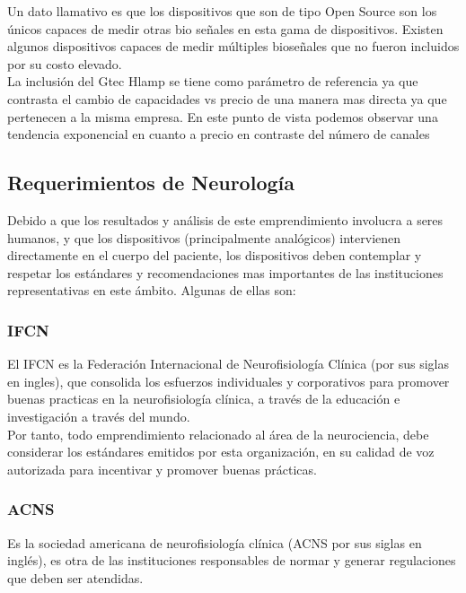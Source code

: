 Un dato llamativo es que los dispositivos que son de tipo Open Source son los únicos capaces de medir otras bio señales en esta gama de dispositivos. Existen algunos dispositivos capaces de medir múltiples bioseñales que no fueron incluidos por su costo elevado.\\

La inclusión del Gtec Hlamp se tiene como parámetro de referencia ya que contrasta el cambio de capacidades vs precio de una manera mas directa ya que pertenecen a la misma empresa. En este punto de vista podemos observar una tendencia exponencial en cuanto a precio en contraste del número de canales\\

\subsection{Requerimientos de Neurología}
\label{sec:orgfa1d83e}
Debido a que los resultados y análisis de este emprendimiento involucra a seres humanos, y que los dispositivos (principalmente analógicos) intervienen directamente en el cuerpo del paciente, los dispositivos deben contemplar y respetar los estándares y recomendaciones mas importantes de las instituciones representativas en este ámbito. Algunas de ellas son:\\

\subsubsection{IFCN}
\label{sec:org922d89e}
El IFCN es la Federación Internacional de Neurofisiología Clínica (por sus siglas en ingles), que consolida los esfuerzos individuales y corporativos para promover buenas practicas en la neurofisiología clínica, a través de la educación e investigación a través del mundo.\\

Por tanto, todo emprendimiento relacionado al área de la neurociencia, debe considerar los estándares emitidos por esta organización, en su calidad de voz autorizada para incentivar y promover buenas prácticas.\\

\subsubsection{ACNS}
\label{sec:org94db6ff}
Es la sociedad americana de neurofisiología clínica (ACNS por sus siglas en inglés), es otra de las instituciones responsables de normar y generar regulaciones que deben ser atendidas.\\
